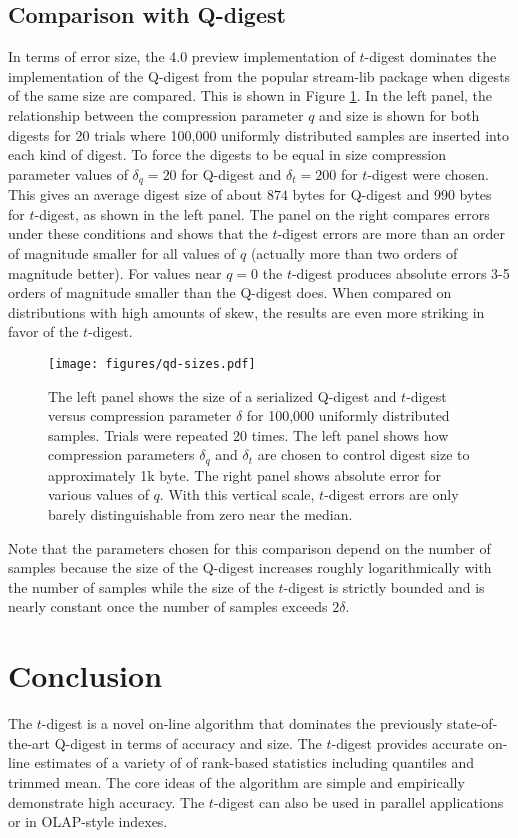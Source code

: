 \documentclass[]{statsoc}
\begin{document}
\subsection{Comparison with Q-digest}
In terms of error size, the 4.0 preview implementation of $t$-digest dominates the implementation of the Q-digest\citep{qdigest} from the popular stream-lib package \citep{github:stream} when digests of the same size are compared.  This is shown in Figure \ref{fig:qd-comparison}.  In the left panel, the relationship between the compression parameter $q$ and size is shown for both digests for 20 trials where 100,000 uniformly distributed samples are inserted into each kind of digest.  To force the digests to be equal in size compression parameter values of $\delta_q=20$ for Q-digest  and $\delta_t = 200$ for $t$-digest were chosen. This gives an average digest size of about $874$ bytes for Q-digest and 990 bytes for $t$-digest, as shown in the left panel. The panel on the right compares errors under these conditions and shows that the $t$-digest errors are more than an order of magnitude smaller for all values of $q$ (actually more than two orders of magnitude better). For values near $q=0$ the $t$-digest produces absolute errors 3-5 orders of magnitude smaller than the Q-digest does. When compared on distributions with high amounts of skew, the results are even more striking in favor of the $t$-digest.
\begin{figure}[htb] %
   \centering
   \texttt{[image: figures/qd-sizes.pdf]} 
   \caption{The left panel shows the size of a serialized Q-digest and $t$-digest versus compression parameter $\delta$ for 100,000 uniformly distributed samples. Trials were repeated 20 times. The left panel shows how compression parameters $\delta_q$ and $\delta_t$ are chosen to control digest size to approximately 1k byte. The right panel shows absolute error for various values of $q$.  With this vertical scale, $t$-digest errors are only barely distinguishable from zero near the median.  }
   \label{fig:qd-comparison}
\end{figure}
Note that the parameters chosen for this comparison depend on the number of samples because the size of the Q-digest increases roughly logarithmically with the number of samples while the size of the $t$-digest is strictly bounded and is nearly constant once the number of samples exceeds $2 \delta$. 

\section{Conclusion}
The $t$-digest is a novel on-line algorithm that dominates the previously state-of-the-art Q-digest in terms of accuracy and size.  The $t$-digest provides accurate on-line estimates of a variety of of rank-based statistics including quantiles and trimmed mean.  The core ideas of the algorithm are simple and empirically demonstrate high accuracy.  The $t$-digest can also be used in parallel applications or in OLAP-style indexes.  
\end{document}
